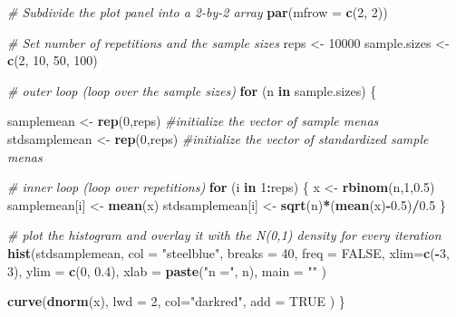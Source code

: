 \documentclass[]{book}
\newenvironment{Shaded}{\begin{snugshade}}{\end{snugshade}}
\newcommand{\KeywordTok}[1]{\textcolor[rgb]{0.13,0.29,0.53}{\textbf{#1}}}
\newcommand{\DataTypeTok}[1]{\textcolor[rgb]{0.13,0.29,0.53}{#1}}
\newcommand{\DecValTok}[1]{\textcolor[rgb]{0.00,0.00,0.81}{#1}}
\newcommand{\FloatTok}[1]{\textcolor[rgb]{0.00,0.00,0.81}{#1}}
\newcommand{\StringTok}[1]{\textcolor[rgb]{0.31,0.60,0.02}{#1}}
\newcommand{\CommentTok}[1]{\textcolor[rgb]{0.56,0.35,0.01}{\textit{#1}}}
\newcommand{\OtherTok}[1]{\textcolor[rgb]{0.56,0.35,0.01}{#1}}
\newcommand{\ControlFlowTok}[1]{\textcolor[rgb]{0.13,0.29,0.53}{\textbf{#1}}}
\newcommand{\OperatorTok}[1]{\textcolor[rgb]{0.81,0.36,0.00}{\textbf{#1}}}
\newcommand{\NormalTok}[1]{#1}
\theoremstyle{definition}
\theoremstyle{definition}
\theoremstyle{definition}
\theoremstyle{remark}
\begin{document}
\begin{Shaded}
\begin{Highlighting}[]
\CommentTok{# Subdivide the plot panel into a 2-by-2 array}
\KeywordTok{par}\NormalTok{(}\DataTypeTok{mfrow =} \KeywordTok{c}\NormalTok{(}\DecValTok{2}\NormalTok{, }\DecValTok{2}\NormalTok{))}

\CommentTok{# Set number of repetitions and the sample sizes}
\NormalTok{reps <-}\StringTok{ }\DecValTok{10000}
\NormalTok{sample.sizes <-}\StringTok{ }\KeywordTok{c}\NormalTok{(}\DecValTok{2}\NormalTok{, }\DecValTok{10}\NormalTok{, }\DecValTok{50}\NormalTok{, }\DecValTok{100}\NormalTok{)}

\CommentTok{# outer loop (loop over the sample sizes)}
  \ControlFlowTok{for}\NormalTok{ (n }\ControlFlowTok{in}\NormalTok{ sample.sizes) \{}
    
\NormalTok{    samplemean <-}\StringTok{ }\KeywordTok{rep}\NormalTok{(}\DecValTok{0}\NormalTok{,reps) }\CommentTok{#initialize the vector of sample menas}
\NormalTok{    stdsamplemean <-}\StringTok{ }\KeywordTok{rep}\NormalTok{(}\DecValTok{0}\NormalTok{,reps) }\CommentTok{#initialize the vector of standardized sample menas}

\CommentTok{# inner loop (loop over repetitions)   }
    \ControlFlowTok{for}\NormalTok{ (i }\ControlFlowTok{in} \DecValTok{1}\OperatorTok{:}\NormalTok{reps) \{}
\NormalTok{      x <-}\StringTok{ }\KeywordTok{rbinom}\NormalTok{(n,}\DecValTok{1}\NormalTok{,}\FloatTok{0.5}\NormalTok{)}
\NormalTok{      samplemean[i] <-}\StringTok{ }\KeywordTok{mean}\NormalTok{(x)}
\NormalTok{      stdsamplemean[i] <-}\StringTok{ }\KeywordTok{sqrt}\NormalTok{(n)}\OperatorTok{*}\NormalTok{(}\KeywordTok{mean}\NormalTok{(x)}\OperatorTok{-}\FloatTok{0.5}\NormalTok{)}\OperatorTok{/}\FloatTok{0.5}
\NormalTok{    \}}
    
\CommentTok{# plot the histogram and overlay it with the N(0,1) density for every iteration    }
    \KeywordTok{hist}\NormalTok{(stdsamplemean, }
         \DataTypeTok{col =} \StringTok{"steelblue"}\NormalTok{, }
         \DataTypeTok{breaks =} \DecValTok{40}\NormalTok{, }
         \DataTypeTok{freq =} \OtherTok{FALSE}\NormalTok{, }
         \DataTypeTok{xlim=}\KeywordTok{c}\NormalTok{(}\OperatorTok{-}\DecValTok{3}\NormalTok{, }\DecValTok{3}\NormalTok{), }
         \DataTypeTok{ylim =} \KeywordTok{c}\NormalTok{(}\DecValTok{0}\NormalTok{, }\FloatTok{0.4}\NormalTok{), }
         \DataTypeTok{xlab =} \KeywordTok{paste}\NormalTok{(}\StringTok{"n ="}\NormalTok{, n), }
         \DataTypeTok{main =} \StringTok{""}
\NormalTok{         )}
    
    \KeywordTok{curve}\NormalTok{(}\KeywordTok{dnorm}\NormalTok{(x), }
          \DataTypeTok{lwd =} \DecValTok{2}\NormalTok{, }
          \DataTypeTok{col=}\StringTok{"darkred"}\NormalTok{, }
          \DataTypeTok{add =} \OtherTok{TRUE}
\NormalTok{          )}
\NormalTok{  \}  }
\end{Highlighting}
\end{Shaded}
\end{document}
